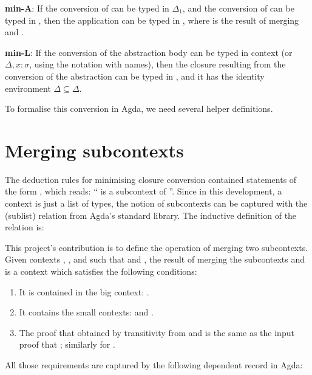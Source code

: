 \documentclass[bsc,frontabs,oneside,singlespacing,parskip,deptreport]{infthesis}
\theoremstyle{definition}
\theoremstyle{lemma}
\begin{document}
\textbf{min-A}: If the conversion  of  can be typed in
$\Delta_1$, and the conversion  of  can be typed in ,
then the application  can be typed in , where 
is the result of merging  and .

\textbf{min-L}: If the conversion  of the abstraction body
 can be typed in context  (or $\Delta, x : \sigma$,
using the notation with names), then the closure resulting from the
conversion of the abstraction can be typed in , and it has the
identity environment $\Delta \subseteq \Delta$.

To formalise this conversion in Agda, we need several helper
definitions.

\section{Merging subcontexts}
\label{sec:merging-subcontexts}

The deduction rules for minimising closure conversion contained
statements of the form , which reads: `` is a
subcontext of ''. Since in this development, a context is just a
list of types, the notion of subcontexts can be captured with the
 (sublist) relation from Agda's standard library. The
inductive definition of the relation is:


This project's contribution is to define the operation of merging two
subcontexts. Given contexts , , and  such that
 and , the result of merging the subcontexts
 and  is a context  which satisfies the following
conditions:

\begin{enumerate}
\item It is contained in the big context: .
\item It contains the small contexts:  and .
\item The proof that  obtained by transitivity from  and  is the same as the input proof that ; similarly for .
\end{enumerate}

All those requirements are captured by the following dependent record
in Agda:

\end{document}
